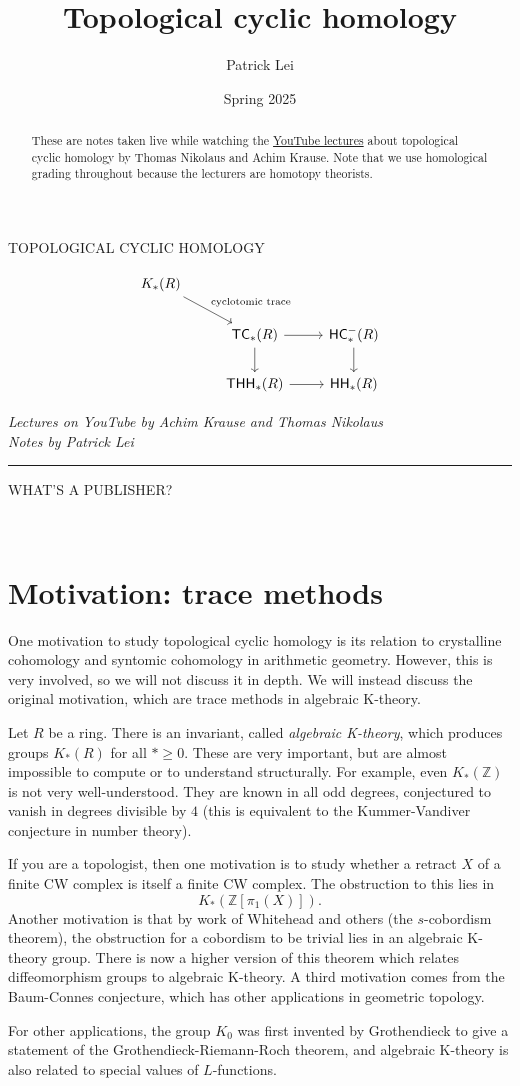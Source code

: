 \documentclass[10pt, oneside]{memoir}
\title{Topological cyclic homology}
\author{Patrick Lei}
\date{Spring 2025}
\theoremstyle{definition}
\theoremstyle{remark}
\theoremstyle{plain}
\theoremstyle{definition}
\theoremstyle{remark}
\newcommand{\Z}{\mathbb{Z}}
\newcommand{\ms}[1]{\mathsf{#1}}
\newcommand{\1}{\mathbf{1}}
\newcommand{\2}{\mathbf{2}}
\newcommand{\3}{\mathbf{3}}
\newcommand{\HC}{\ms{HC}}
\newcommand{\THH}{\ms{THH}}
\newcommand{\TC}{\ms{TC}}
\newcommand{\HH}{\ms{HH}}
\newcommand*{\titleGWP}{\begingroup%
\newlength{\drop}
\setlength{\drop}{0.1\textheight}
\vspace*{\drop}
\begin{center}
\Huge\color{violet}
TOPOLOGICAL CYCLIC HOMOLOGY
\end{center}
\vfill
\begin{center}
{\begin{equation*}
    \begin{tikzcd}[ampersand replacement=\&]
        K_*(R) \ar{dr}{\text{cyclotomic trace}} \\
        \& \TC_*(R) \ar{r} \ar{d} \& \HC_*^-(R) \ar{d} \\
        \& \THH_*(R) \ar{r} \& \HH_*(R)
    \end{tikzcd}
    \end{equation*}}
\end{center}
\vfill
\begin{center}
\large
{\itshape Lectures on YouTube by Achim Krause and Thomas Nikolaus \\
\normalsize
Notes by Patrick Lei} \\
{\color{violet} \rule{\textwidth}{0.4pt}}
WHAT'S A PUBLISHER?
\end{center}
\vspace*{0.5\drop}
\endgroup}
\begin{document}
\titleGWP\thispagestyle{empty}
\newpage
\ \thispagestyle{empty}
\newpage
\vfill
\begin{abstract}\thispagestyle{empty}
    These are notes taken live while watching the \href{https://www.youtube.com/playlist?list=PLsmqTkj4MGTB8pNGvW0iuKUFmBlOSke-C}{YouTube lectures} about topological cyclic homology by Thomas Nikolaus and Achim Krause. Note that we use homological grading throughout because the lecturers are homotopy theorists.
\end{abstract}
\vfill
\clearpage
\tableofcontents
\clearpage

\section*{Motivation: trace methods}%
\label{sec:Motivation}

One motivation to study topological cyclic homology is its relation to crystalline cohomology and syntomic cohomology in arithmetic geometry. However, this is very involved, so we will not discuss it in depth. We will instead discuss the original motivation, which are trace methods in algebraic K-theory.

Let \(R \) be a ring. There is an invariant, called \textit{algebraic K-theory}, which produces groups \(K_*(R) \) for all \(* \geq 0 \). These are very important, but are almost impossible to compute or to understand structurally. For example, even \(K_*(\Z) \) is not very well-understood. They are known in all odd degrees, conjectured to vanish in degrees divisible by \(4 \) (this is equivalent to the Kummer-Vandiver conjecture in number theory). 

If you are a topologist, then one motivation is to study whether a retract \(X \) of a finite CW complex is itself a finite CW complex. The obstruction to this lies in 
\[
    K_*(\Z[\pi_1(X)]).
\]
Another motivation is that by work of Whitehead and others (the \(s \)-cobordism theorem), the obstruction for a cobordism to be trivial lies in an algebraic K-theory group. There is now a higher version of this theorem which relates diffeomorphism groups to algebraic K-theory. A third motivation comes from the Baum-Connes conjecture, which has other applications in geometric topology. 

For other applications, the group \(K_0 \) was first invented by Grothendieck to give a statement of the Grothendieck-Riemann-Roch theorem, and algebraic K-theory is also related to special values of \(L \)-functions. 
\end{document}
